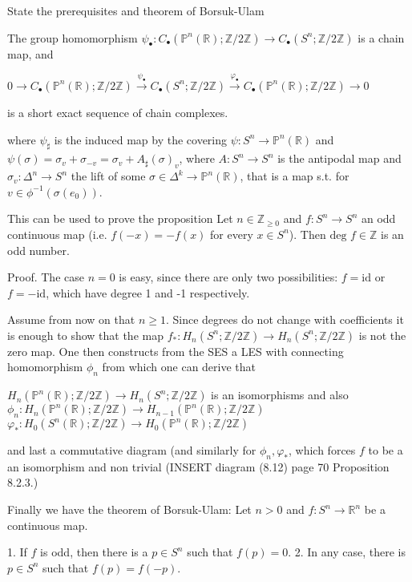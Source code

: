 State the prerequisites and theorem of Borsuk-Ulam

The group homomorphism \(\psi_\bullet \colon C_\bullet(\mathbb{P}^n(\mathbb{R}); \mathbb{Z}/2\mathbb{Z}) \to C_\bullet(S^n; \mathbb{Z}/2\mathbb{Z})\) 
is a chain map, and

\(
0 \to C_\bullet(\mathbb{P}^n(\mathbb{R}); \mathbb{Z}/2\mathbb{Z}) \xrightarrow{\psi_\bullet} C_\bullet(S^n; \mathbb{Z}/2\mathbb{Z}) \xrightarrow{\varphi_\bullet} C_\bullet(\mathbb{P}^n(\mathbb{R}); \mathbb{Z}/2\mathbb{Z}) \to 0
\)

is a short exact sequence of chain complexes.

where \( \psi_\sharp \) is the induced map by the covering \( \psi: S^n \to \mathbb{P}^n(\mathbb{R}) \) and 
\( \psi(\sigma) = \sigma_v + \sigma_{-v} = \sigma_v + A_{\sharp}(\sigma)_v\), where \( A: S^n \to S^n \) is the antipodal map
and \( \sigma_v : \Delta^n \to S^n \) the lift of some \( \sigma \in \Delta^k \to \mathbb{P}^n(\mathbb{R}) \), that is a map 
s.t. for \( v \in \phi^{-1}(\sigma(e_0)) \).

This can be used to prove the proposition
Let \(n \in \mathbb{Z}_{\geq 0}\) and \(f : S^n \to S^n\) an odd continuous map (i.e. \(f(-x) = -f(x)\) for every \(x \in S^n\)). 
Then \(\text{deg } f \in \mathbb{Z}\) is an odd number. 

Proof.
The case \(n = 0\) is easy, since there are only two possibilities: 
\(f = \text{id}\) or \(f = -\text{id}\), which have degree 1 and -1 respectively.

Assume from now on that \( n \geq 1 \). Since degrees do not change with coefficients it is enough to show that the map 
\(
f_* : H_n(S^n; \mathbb{Z}/2\mathbb{Z}) \to H_n(S^n; \mathbb{Z}/2\mathbb{Z})
\)
is not the zero map. One then constructs from the SES a LES with connecting homomorphism \( \phi_n \) from which one can derive that 

\( H_n(\mathbb{P}^n(\mathbb{R}); \mathbb{Z}/2\mathbb{Z}) \to H_n(S^n; \mathbb{Z}/2\mathbb{Z}) \)
is an isomorphisms and also 
\( \phi_n : H_n(\mathbb{P}^n(\mathbb{R}); \mathbb{Z}/2\mathbb{Z}) \to H_{n-1}(\mathbb{P}^n(\mathbb{R}); \mathbb{Z}/2\mathbb{Z}) \) 
\( \varphi_\ast : H_0(S^n(\mathbb{R}); \mathbb{Z}/2\mathbb{Z}) \to H_{0}(\mathbb{P}^n(\mathbb{R}); \mathbb{Z}/2\mathbb{Z}) \) 

and last a commutative diagram (and similarly for \( \phi_n, \varphi_\ast \), which forces 
\( f \) to be a an isomorphism and non trivial
(INSERT diagram (8.12) page 70 Proposition 8.2.3.)


Finally we have the theorem of Borsuk-Ulam:
Let \(n > 0\) and \(f : S^n \to \mathbb{R}^n\) be a continuous map. 

1. If \( f \) is odd, then there is a \( p \in S^n \) such that \( f(p) = 0 \). 
2. In any case, there is \( p \in S^n \) such that \( f(p) = f(-p) \).
